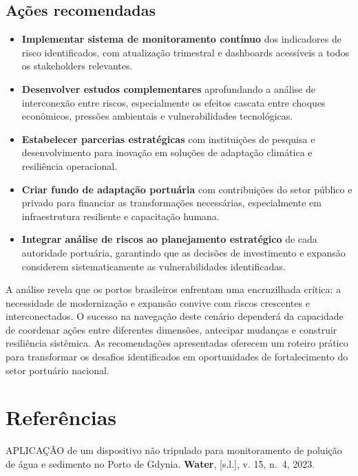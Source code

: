 \documentclass[
  portuguese,
  letterpaper,
  DIV=11,
  numbers=noendperiod]{scrreprt}
\begin{document}
\section{Ações recomendadas}\label{auxe7uxf5es-recomendadas}

\begin{itemize}
\item
  \textbf{Implementar sistema de monitoramento contínuo} dos indicadores
  de risco identificados, com atualização trimestral e dashboards
  acessíveis a todos os stakeholders relevantes.
\item
  \textbf{Desenvolver estudos complementares} aprofundando a análise de
  interconexão entre riscos, especialmente os efeitos cascata entre
  choques econômicos, pressões ambientais e vulnerabilidades
  tecnológicas.
\item
  \textbf{Estabelecer parcerias estratégicas} com instituições de
  pesquisa e desenvolvimento para inovação em soluções de adaptação
  climática e resiliência operacional.
\item
  \textbf{Criar fundo de adaptação portuária} com contribuições do setor
  público e privado para financiar as transformações necessárias,
  especialmente em infraestrutura resiliente e capacitação humana.
\item
  \textbf{Integrar análise de riscos ao planejamento estratégico} de
  cada autoridade portuária, garantindo que as decisões de investimento
  e expansão considerem sistematicamente as vulnerabilidades
  identificadas.
\end{itemize}

A análise revela que os portos brasileiros enfrentam uma encruzilhada
crítica: a necessidade de modernização e expansão convive com riscos
crescentes e interconectados. O sucesso na navegação deste cenário
dependerá da capacidade de coordenar ações entre diferentes dimensões,
antecipar mudanças e construir resiliência sistêmica. As recomendações
apresentadas oferecem um roteiro prático para transformar os desafios
identificados em oportunidades de fortalecimento do setor portuário
nacional.


\chapter{Referências}\label{referuxeancias}

APLICAÇÃO de um dispositivo não tripulado para monitoramento de poluição
de água e sedimento no Porto de Gdynia. \textbf{Water}, {[}s.l.{]}, v.
15, n.~4, 2023.
\end{document}
